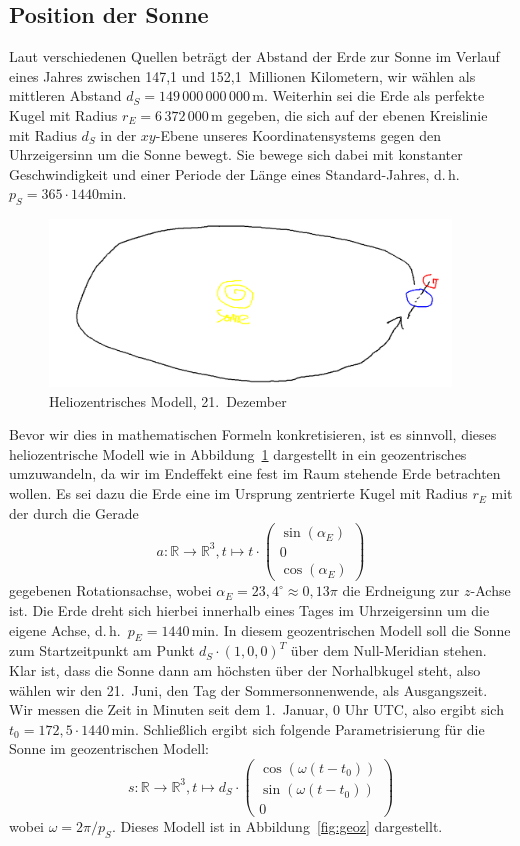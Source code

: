 \documentclass[
    paper=a4,
    DIV14,
    fontsize=12pt,
    pagesize=pdftex,
    toc=bibliographynumbered
]{scrartcl}
\numberwithin{figure}{section}
\numberwithin{equation}{section}
\numberwithin{table}{section}
\newcommand*\setR{\mathds{R}}
\newcommand*\vecd[3]{\begin{pmatrix} #1 \\ #2 \\ #3 \end{pmatrix}}
\begin{document}
\subsection{Position der Sonne}

Laut verschiedenen Quellen beträgt der Abstand der Erde zur Sonne im Verlauf eines Jahres
zwischen 147{,}1 und 152{,}1~Millionen Kilometern, wir wählen als mittleren Abstand $d_S =
149\,000\,000\,000\,\mathrm m$. Weiterhin sei die Erde als perfekte Kugel mit Radius $r_E
= 6\,372\,000\,\mathrm m$ gegeben, die sich auf der ebenen Kreislinie mit Radius $d_S$ in
der $xy$-Ebene unseres Koordinatensystems gegen den Uhrzeigersinn um die Sonne bewegt. Sie
bewege sich dabei mit konstanter Geschwindigkeit und einer Periode der Länge eines
Standard-Jahres, d.\,h.\ $p_S = 365\cdot 1440 \mathrm{min}$.

\begin{figure}[htb]
    \centering
    \includegraphics[width=0.95\textwidth]{images/tmp/helioz.png}
    \caption{Heliozentrisches Modell, 21.\ Dezember}
    \label{fig:helioz}
\end{figure}

Bevor wir dies in mathematischen Formeln konkretisieren, ist es sinnvoll, dieses
heliozentrische Modell wie in Abbildung~\ref{fig:helioz} dargestellt in ein geozentrisches
umzuwandeln, da wir im Endeffekt eine fest im Raum stehende Erde betrachten wollen. Es sei
dazu die Erde eine im Ursprung zentrierte Kugel mit Radius $r_E$ mit der durch die Gerade
\begin{equation*}
    a : \setR \to \setR^3, t \mapsto t\cdot \vecd{\sin(\alpha_E)}0{\cos(\alpha_E)}
\end{equation*}
gegebenen Rotationsachse, wobei $\alpha_E = 23{,}4^\circ \approx 0{,}13\pi$ die Erdneigung
zur $z$-Achse ist. Die Erde dreht sich hierbei innerhalb eines Tages im Uhrzeigersinn um
die eigene Achse, d.\,h.\ $p_E=1440\,\mathrm{min}$. In diesem geozentrischen Modell soll
die Sonne zum Startzeitpunkt am Punkt $d_S \cdot (1, 0, 0)^T$ über dem Null-Meridian
stehen. Klar ist, dass die Sonne dann am höchsten über der Norhalbkugel steht, also wählen
wir den 21.\ Juni, den Tag der Sommersonnenwende, als Ausgangszeit. Wir messen die Zeit in
Minuten seit dem 1.\ Januar, 0 Uhr UTC, also ergibt sich $t_0=172{,}5 \cdot 1440
\,\mathrm{min}$. Schließlich ergibt sich folgende Parametrisierung für die Sonne im
geozentrischen Modell:
\begin{equation*}
    s: \setR \to \setR^3, t\mapsto d_S \cdot
        \vecd{\cos( \omega(t - t_0) )}{\sin( \omega(t - t_0) )}0
\end{equation*}
wobei $\omega = 2\pi/p_S$. Dieses Modell ist in Abbildung~\ref{fig:geoz} dargestellt.
\end{document}
